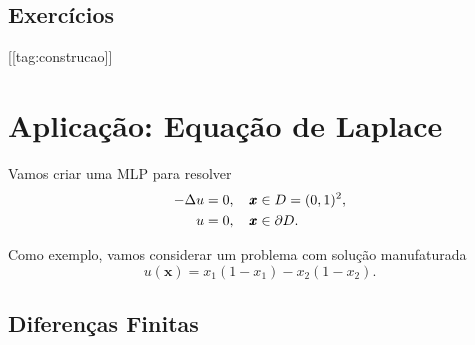 \subsection{Exercícios}

[[tag:construcao]]

\section{Aplicação: Equação de Laplace}\label{cap_mlp_sec_eqlaplace}

Vamos criar uma MLP para resolver
\begin{subequations}
  \begin{align}
    -\Delta u &= 0,\quad \pmb{x}\in D = (0, 1)^2,\\
    u &= 0,\quad \pmb{x}\in\partial D.
  \end{align}
\end{subequations}

Como exemplo, vamos considerar um problema com solução manufaturada
\begin{equation}
  u(\pmb{x}) = x_1(1-x_1) - x_2(1-x_2).
\end{equation}

\subsection{Diferenças Finitas}

